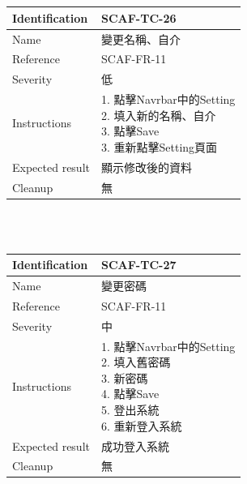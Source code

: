\documentclass{report}
\begin{document}
\\
\newline
\\
\begin{tabularx}{\textwidth}{
  |p{}%
  |p{}|%
  }
  \hline
  \centering Identification &  SCAF-TC-26 \\
  \hline
  \centering Name & 變更名稱、自介 \\
  \hline
  \centering Reference & SCAF-FR-11 \\
  \hline
  \centering Severity & 低 \\
  \hline
  \centering Instructions & 
  \makecell[l]{
    1. 點擊Navrbar中的Setting \\
    2. 填入新的名稱、自介 \\
    3. 點擊Save \\
    3. 重新點擊Setting頁面
  }\\
  \hline
  \centering Expected result & 顯示修改後的資料 \\
  \hline
  \centering Cleanup & 無 \\
  \hline
\end{tabularx}
\\
\newline
\\
\begin{tabularx}{\textwidth}{
  |p{}%
  |p{}|%
  }
  \hline
  \centering Identification &  SCAF-TC-27 \\
  \hline
  \centering Name & 變更密碼 \\
  \hline
  \centering Reference & SCAF-FR-11 \\
  \hline
  \centering Severity & 中 \\
  \hline
  \centering Instructions & 
  \makecell[l]{
    1. 點擊Navrbar中的Setting \\
    2. 填入舊密碼 \\
    3. 新密碼 \\
    4. 點擊Save \\
    5. 登出系統 \\
    6. 重新登入系統
  }\\
  \hline
  \centering Expected result & 成功登入系統 \\
  \hline
  \centering Cleanup & 無 \\
  \hline
\end{tabularx}
\end{document}

